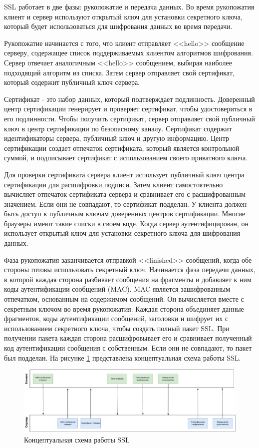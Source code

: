 SSL работает в две фазы: рукопожатие и передача данных. Во время рукопожатия клиент и сервер используют открытый ключ для установки секретного ключа, который будет использоваться для шифрования данных во время передачи.

Рукопожатие начинается с того, что клиент отправляет <<hello>> сообщение серверу, содержащее список поддерживаемых клиентом алгоритмов шифрования. Сервер отвечает аналогичным <<hello>> сообщением, выбирая наиболее подходящий алгоритм из списка. Затем сервер отправляет свой сертификат, который содержит публичный ключ сервера.

Сертификат - это набор данных, который подтверждает подлинность. Доверенный центр сертификации генерирует и проверяет сертификат, чтобы удостовериться в его подлинности. Чтобы получить сертификат, сервер отправляет свой публичный ключ в центр сертификации по безопасному каналу. Сертификат содержит идентификаторы сервера, публичный ключ и другую информацию. Центр сертификации создает отпечаток сертификата, который является контрольной суммой, и подписывает сертификат с использованием своего приватного ключа.

Для проверки сертификата сервера клиент использует публичный ключ центра сертификации для расшифровки подписи. Затем клиент самостоятельно вычисляет отпечаток сертификата сервера и сравнивает его с расшифрованным значением. Если они не совпадают, то сертификат подделан. У клиента должен быть доступ к публичным ключам доверенных центров сертификации. Многие браузеры имеют такие списки в своем коде. Когда сервер аутентифицирован, он использует открытый ключ для установки секретного ключа для шифрования данных.

Фаза рукопожатия заканчивается отправкой <<finished>> сообщений, когда обе стороны готовы использовать секретный ключ. Начинается фаза передачи данных, в которой каждая сторона разбивает сообщения на фрагменты и добавляет к ним коды аутентификации сообщений (MAC). MAC является зашифрованным отпечатком, основанным на содержимом сообщений. Он вычисляется вместе с секретным ключом во время рукопожатия. Каждая сторона объединяет данные фрагментов, коды аутентификации сообщений, заголовки и шифрует их с использованием секретного ключа, чтобы создать полный пакет SSL. При получении пакета каждая сторона расшифровывает его и сравнивает полученный код аутентификации сообщения с собственным. Если они не совпадают, то пакет был подделан. На рисунке \ref{fig:ssl} представлена концептуальная схема работы SSL.

\begin{figure}[H]
	\centering
	\includegraphics[scale=0.5]{img/ssl.pdf}
	\caption{Концептуальная схема работы SSL}
	\label{fig:ssl}
\end{figure}

